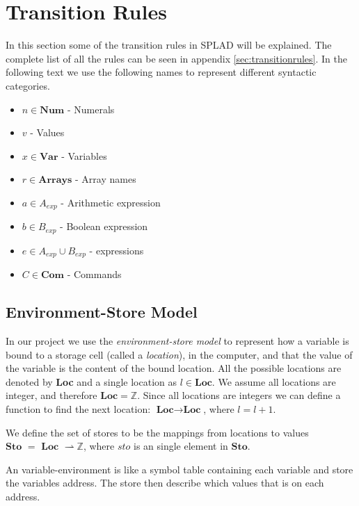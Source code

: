 

\section{Transition Rules}
In this section some of the transition rules in SPLAD will be explained. The complete list of all the rules can be seen in appendix \ref{sec:transitionrules}.
In the following text we use the following names to represent different syntactic categories.
\begin{itemize}
\item $n \in \textbf{Num}$ - Numerals
\item $v$ - Values
\item $x \in \textbf{Var}$ - Variables 
\item $r \in \textbf{Arrays}$ - Array names
\item $a \in A_{exp}$ - Arithmetic expression
\item $b \in B_{exp}$ - Boolean expression
\item $e \in A_{exp} \cup B_{exp}$ - expressions
\item $C \in \textbf{Com}$ - Commands
\end{itemize}

\subsection{Environment-Store Model}
In our project we use the \textit{environment-store model} to represent how a variable is bound to a storage cell (called a \textit{location}), in the computer, and that the value of the variable is the content of the bound location. All the possible locations are denoted by \textbf{Loc} and a single location as $l \in \textbf{Loc}$. We assume all locations are integer, and therefore $\textbf{Loc} = \mathbb{Z}$. Since all locations are integers we can define a function to find the next location: $\textbf{Loc} \rightarrow \textbf{Loc}$, where $l = l + 1$. 

We define the set of stores to be the mappings from locations to values $\textbf{Sto } = \textbf{ Loc } \rightharpoonup \mathbb{Z}$, where $sto$ is an single element in $\textbf{Sto}$.

An variable-environment is like a symbol table containing each variable and store the variables address. The store then describe which values that is on each address.

